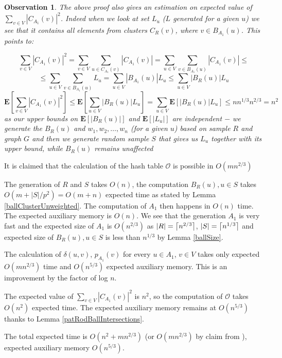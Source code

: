 \documentclass[shortabstract, lic, english]{iithesis}
\theoremstyle{definition} \newtheorem{definition}{Definition}[chapter]
\theoremstyle{plain} \newtheorem{remark}[definition]{Observation}
\theoremstyle{plain} \newtheorem{theorem}[definition]{Theorem}
\theoremstyle{plain} \newtheorem{lemma}[definition]{Lemma}
\theoremstyle{plain} \newtheorem{conjecture}[definition]{Conjecture}
\DeclarePairedDelimiter{\ceil}{\lceil}{\rceil}
\begin{document}
\begin{remark}
    The above proof also gives an estimation on expected value of $\sum_{v \in V}|C_{A_1}(v)|^2$.
    Indeed when we look at set $L_u$ ($L$ generated for a given $u$) we see that it contains all elements from clusters $C_R(v)$, where $v \in B_{A_1}(u)$.
    This points to:

    $$\sum_{v \in V}|C_{A_1}(v)|^2 = \sum_{v \in V}\sum_{u \in C_{A_1}(v)}|C_{A_1}(v)| = \sum_{u \in V}\sum_{v \in B_{A_1}(u)} |C_{A_1}(v)| \leq$$
    $$\leq \sum_{u \in V}\sum_{v \in B_{A_1}(u)} L_u = \sum_{u \in V} |B_{A_1}(u)|  L_u \leq \sum_{u \in V} |B_R(u)|  L_u$$
    $$\mathbf{E}[\sum_{v \in V}|C_{A_1}(v)|^2] \leq \mathbf{E}[\sum_{u \in V} |B_R(u)|  L_u] = \sum_{u \in V} \mathbf{E}[|B_R(u)|  L_u] \leq n  n^{1/3}  n^{2/3} = n^2$$
    as our upper bounds on $\mathbf{E}[|B_R(u)|]$ and $\mathbf{E}[|L_u|]$ are independent $-$ we generate the $B_R(u)$ and $w_1, w_2, \ldots, w_n$ (for a given $u$) based on sample $R$ and graph $G$
    and then we generate random sample $S$ that gives us $L_u$ together with its upper bound, while $B_R(u)$ remains unaffected
\end{remark}

It is claimed that the calculation of the hash table $\mathcal{O}$ is possible in $O(mn^{2/3})$ \cite{21OracleSpannerNoPenaltyNoLog}

The generation of $R$ and $S$ takes $O(n)$,
the computation $B_R(u), u \in S$ takes $O(m + |S|/p^2) = O(m + n)$ expected time as stated by Lemma \ref{ballClusterUnweighted}.
The computation of $A_1$ then happens in $O(n)$ time. The expected auxiliary memory is $O(n)$.
We see that the generation $A_1$ is very fast and the expected size of $A_1$ is $O(n^{2/3})$
as $|R| = \ceil[\big]{n^{2/3}}$, $|S| = \ceil[\big]{n^{1/3}}$ and expected size of $B_R(u), u \in S$ is less than $n^{1/3}$ by Lemma \ref{ballSize}.

The calculation of $\delta(u,v)$, $p_{A_1}(v)$ for every $u \in A_1$, $v \in V$ takes only expected $O(mn^{2/3})$ time and $O(n^{5/3})$ expected auxiliary memory.
This is an improvement by the factor of log $n$.

The expected value of $\sum_{v \in V}|C_{A_1}(v)|^2$ is $n^2$, so the computation of $\mathcal{O}$ takes $O(n^2)$ expected time.
The expected auxiliary memory remains at $O(n^{5/3})$ thanks to Lemma \ref{patRodBallIntersections}.

The total expected time is $O(n^{2} + mn^{2/3})$ (or $O(mn^{2/3})$ by claim from \cite{21OracleSpannerNoPenaltyNoLog}), expected auxiliary memory $O(n^{5/3})$.
\end{document}
